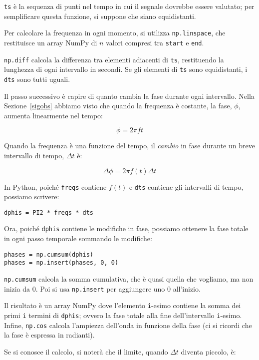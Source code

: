 \documentclass[12pt]{book} \usepackage[width=5.5in,height=8.5in, hmarginratio=3:2,vmarginratio=1:1]{geometry}
\begin{document}
{\tt ts} è la sequenza di punti nel tempo in cui il segnale dovrebbe essere valutato; per semplificare questa funzione, si suppone che siano equidistanti.

Per calcolare la frequenza in ogni momento, si utilizza {\tt np.linspace}, che restituisce un array NumPy di $n$ valori compresi tra {\tt start} e {\tt end}.

{\tt np.diff} calcola la differenza tra elementi adiacenti di {\tt ts}, restituendo la lunghezza di ogni intervallo in secondi. Se gli elementi di {\tt ts} sono equidistanti, i {\tt dts} sono tutti uguali.

Il passo successivo è capire di quanto cambia la fase durante ogni intervallo. Nella Sezione~\ref{sigobs} abbiamo visto che quando la frequenza è costante, la fase, $\phi$, aumenta linearmente nel tempo:

%
\[ \phi = 2 \pi f t \] 

%
Quando la frequenza è una funzione del tempo, il {\em cambio} in fase durante un breve intervallo di tempo, $\Delta t$ è:

%
\[ \Delta \phi = 2 \pi f(t) \Delta t \] 

%
In Python, poiché {\tt freqs} contiene $f(t)$ e {\tt dts} contiene gli intervalli di tempo, possiamo scrivere:

\begin{verbatim} 
dphis = PI2 * freqs * dts
 \end{verbatim} 

Ora, poiché {\tt dphis} contiene le modifiche in fase, possiamo ottenere la fase totale in ogni passo temporale sommando le modifiche:

\begin{verbatim} 
phases = np.cumsum(dphis)
phases = np.insert(phases, 0, 0)
 \end{verbatim} 

{\tt np.cumsum} calcola la somma cumulativa, che è quasi quella che vogliamo, ma non inizia da 0. Poi si usa {\tt np.insert} per aggiungere uno 0 all'inizio.

Il risultato è un array NumPy dove l'elemento {\tt i}-esimo contiene la somma dei primi {\tt i} termini di {\tt dphis}; ovvero la fase totale alla fine dell'intervallo {\tt i}-esimo. Infine, {\tt np.cos} calcola l'ampiezza dell'onda in funzione della fase (ci si ricordi che la fase è espressa in radianti).

Se si conosce il calcolo, si noterà che il limite, quando $\Delta t$ diventa piccolo, è:
\end{document}
